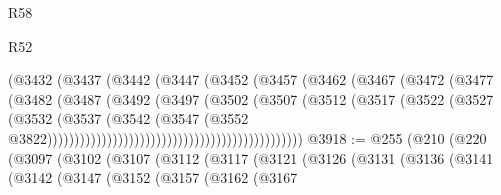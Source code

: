 \begin{lexlean}{R58}
\begin{lexlean}{R52}
\begin{coremodule}
{{{{{{{{{{{{{{{{{{{{{{{{{{{{{{{{{{{{{{{{{{{{{{{{{{{{{{{{{{{{{{{{{{{{{{{{{{{{{{{{{{{{{{{{{{{{{{{{{{{{{{{{{{{{{{{{{{{{{{{{{{{{{{{{{{{{{{{{{{{{{{{{{{{{{{{{{{{{{{{{{{{{{{{{{{{{{{{{{{{{{{{{{{{{{{{{{{{{{{                                                (@3432
                                                  (@3437
                                                    (@3442
                                                      (@3447
                                                        (@3452
                                                          (@3457
                                                            (@3462
                                                              (@3467
                                                                (@3472
                                                                  (@3477
                                                                    (@3482
                                                                      (@3487
                                                                        (@3492
                                                                          (@3497
                                                                            (@3502
                                                                              (@3507
                                                                                (@3512
                                                                                  (@3517
                                                                                    (@3522
                                                                                      (@3527
                                                                                        (@3532
                                                                                          (@3537
                                                                                            (@3542
                                                                                              (@3547
                                                                                                (@3552
                                                                                                  @3822)))))))))))))))))))))))))))))))))))))))))))))))
@3918 := @255
    (@210
      (@220
        (@3097
          (@3102
            (@3107
              (@3112
                (@3117
                  (@3121
                    (@3126
                      (@3131
                        (@3136
                          (@3141
                            (@3142
                              (@3147
                                (@3152
                                  (@3157
                                    (@3162
                                      (@3167
}}}}}}}}}}}}}}}}}}}}}}}}}}}}}}}}}}}}}}}}}}}}}}}}}}}}}}}}}}}}}}}}}}}}}}}}}}}}}}}}}}}}}}}}}}}}}}}}}}}}}}}}}}}}}}}}}}}}}}}}}}}}}}}}}}}}}}}}}}}}}}}}}}}}}}}}}}}}}}}}}}}}}}}}}}}}}}}}}}}}}}}}}}}}}}}}}}}}}}
\end{coremodule}
\end{lexlean}
\end{lexlean}

